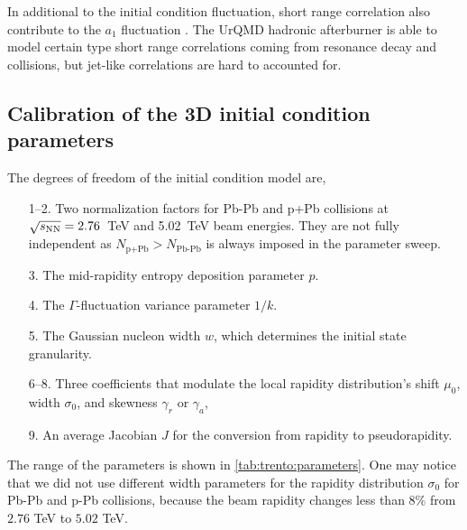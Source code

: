 In additional to the initial condition fluctuation, short range correlation also contribute to the $a_1$ fluctuation \cite{Denicol:2015bnf}.
The UrQMD hadronic afterburner is able to model certain type short range correlations coming from resonance decay and collisions, but jet-like correlations are hard to accounted for.

\subsection{Calibration of the 3D initial condition parameters}
The degrees of freedom of the initial condition model are,
\begin{itemize}[itemsep=0pt]
  \item[1--2.] Two normalization factors for Pb-Pb and p+Pb collisions at $\sqrt{s_\mathrm{NN}}=2.76$~TeV and 5.02~TeV beam energies. They are not fully independent as $N_{\textrm{p+Pb}} > N_{\textrm{Pb-Pb}}$ is always imposed in the parameter sweep.
  \item[3.] The mid-rapidity entropy deposition parameter $p$.
  \item[4.] The $\Gamma$-fluctuation variance parameter $1/k$.
  \item[5.] The Gaussian nucleon width $w$, which determines the initial state granularity.
  \item[6--8.] Three coefficients that modulate the local rapidity distribution's shift $\mu_0$, width $\sigma_0$, and skewness $\gamma_r$ or $\gamma_a$,
  \item[9.] An average Jacobian $J$ for the conversion from rapidity to pseudorapidity.
\end{itemize}
The range of the parameters is shown in \ref{tab:trento:parameters}.
One may notice that we did not use different width parameters for the rapidity distribution $\sigma_0$ for Pb-Pb and p-Pb collisions, because the beam rapidity changes less than $8\%$ from $2.76$ TeV to $5.02$ TeV.

